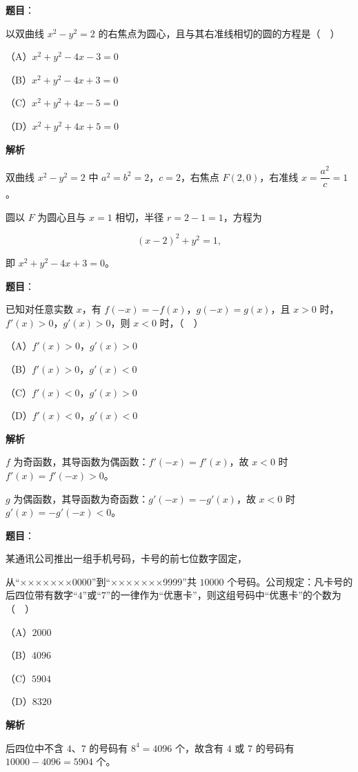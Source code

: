 \begin{answer}

\textbf{题目}：

以双曲线 $x^2-y^2=2$ 的右焦点为圆心，且与其右准线相切的圆的方程是（　）

（A）$x^2+y^2-4x-3=0$

（B）$x^2+y^2-4x+3=0$

（C）$x^2+y^2+4x-5=0$

（D）$x^2+y^2+4x+5=0$

\textbf{解析}

双曲线 $x^2-y^2=2$ 中 $a^2=b^2=2$，$c=2$，右焦点 $F(2,0)$，右准线 $x=\dfrac{a^2}c=1$。

圆以 $F$ 为圆心且与 $x=1$ 相切，半径 $r=2-1=1$，方程为

\nopagebreak[4]
\[(x-2)^2+y^2=1,\]

即 $x^2+y^2-4x+3=0$。


\end{answer}
\begin{answer}

\textbf{题目}：

已知对任意实数 $x$，有 $f(-x)=-f(x)$，$g(-x)=g(x)$，且 $x>0$ 时，$f'(x)>0$，$g'(x)>0$，则 $x<0$ 时，（　）

（A）$f'(x)>0$，$g'(x)>0$

（B）$f'(x)>0$，$g'(x)<0$

（C）$f'(x)<0$，$g'(x)>0$

（D）$f'(x)<0$，$g'(x)<0$

\textbf{解析}

$f$ 为奇函数，其导函数为偶函数：$f'(-x)=f'(x)$，故 $x<0$ 时 $f'(x)=f'(-x)>0$。

$g$ 为偶函数，其导函数为奇函数：$g'(-x)=-g'(x)$，故 $x<0$ 时 $g'(x)=-g'(-x)<0$。


\end{answer}
\begin{answer}

\textbf{题目}：

某通讯公司推出一组手机号码，卡号的前七位数字固定，

从“×××××××0000”到“×××××××9999”共 $10000$ 个号码。公司规定：凡卡号的后四位带有数字“$4$”或“$7$”的一律作为“优惠卡”，则这组号码中“优惠卡”的个数为（　）

（A）$2000$

（B）$4096$

（C）$5904$

（D）$8320$

\textbf{解析}

后四位中不含 $4$、$7$ 的号码有 $8^4=4096$ 个，故含有 $4$ 或 $7$ 的号码有 $10000-4096=5904$ 个。


\end{answer}
